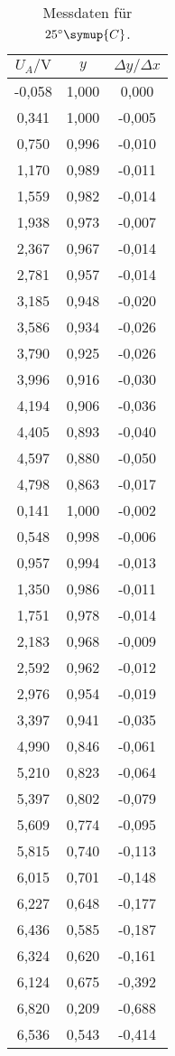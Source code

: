 \begin{longtable}{c c c}
	\caption{Messdaten für $25^\circ \symup{C}$.}
	\label{tab:25}\\
	\hline
	$U_A / \si{\volt}$ & $y$  & $\Delta y / \Delta x$ \\
	\hline
	-0,058&1,000&0,000 \\
	0,341&1,000&-0,005 \\
	0,750&0,996&-0,010 \\
	1,170&0,989&-0,011 \\
	1,559&0,982&-0,014 \\
	1,938&0,973&-0,007 \\
	2,367&0,967&-0,014 \\
	2,781&0,957&-0,014 \\
	3,185&0,948&-0,020 \\
	3,586&0,934&-0,026 \\
	3,790&0,925&-0,026 \\
	3,996&0,916&-0,030 \\
	4,194&0,906&-0,036 \\
	4,405&0,893&-0,040 \\
	4,597&0,880&-0,050 \\
	4,798&0,863&-0,017 \\
	0,141&1,000&-0,002 \\
	0,548&0,998&-0,006 \\
	0,957&0,994&-0,013 \\
	1,350&0,986&-0,011 \\
	1,751&0,978&-0,014 \\
	2,183&0,968&-0,009 \\
	2,592&0,962&-0,012 \\
	2,976&0,954&-0,019 \\
	3,397&0,941&-0,035 \\
	4,990&0,846&-0,061 \\
	5,210&0,823&-0,064 \\
	5,397&0,802&-0,079 \\
	5,609&0,774&-0,095 \\
	5,815&0,740&-0,113 \\
	6,015&0,701&-0,148 \\
	6,227&0,648&-0,177 \\
	6,436&0,585&-0,187 \\
	6,324&0,620&-0,161 \\
	6,124&0,675&-0,392 \\
	6,820&0,209&-0,688 \\
	6,536&0,543&-0,414 \\

\end{longtable}
